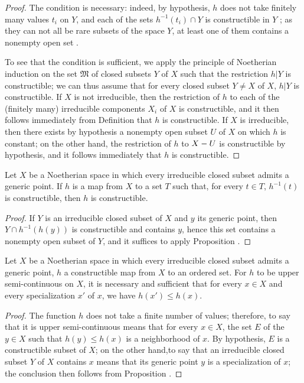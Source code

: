 \begin{proof}
The condition is necessary: indeed, by hypothesis, $h$ does not take finitely many values $t_i$ on $Y$, and each of the sets $h^{-1}(t_i)\cap Y$ is constructible in $Y$ ; as they can not all be rare subsets of the space $Y$, at least one of them contains a nonempty open set .

To see that the condition is sufficient, we apply the principle of Noetherian induction on the set $\mathfrak{M}$ of closed subsets $Y$ of $X$ such that the restriction $h|Y$ is constructible; we can thus assume that for every closed subset $Y\neq X$ of $X$,
$h|Y$ is constructible.
If $X$ is not irreducible, then the restriction of $h$ to each of the (finitely many) irreducible components $X_i$ of $X$ is constructible, and it then follows immediately from Definition  that $h$ is constructible.
If $X$ is irreducible, then there exists by hypothesis a nonempty open subset $U$ of $X$ on which $h$ is constant; on the other hand, the restriction of $h$ to $X- U$ is constructible by hypothesis, and it follows immediately that $h$ is constructible.
\end{proof}

\begin{corollary}[9.3.3]
\label{0.9.3.3}
Let $X$ be a Noetherian space in which every irreducible closed subset admits a generic point.
If $h$ is a map from $X$ to a set $T$ such that, for every $t\in T$, $h^{-1}(t)$ is constructible, then $h$ is constructible.
\end{corollary}

\begin{proof}
If $Y$ is an irreducible closed subset of $X$ and $y$ its generic point, then $Y\cap h^{-1}(h(y))$ is constructible and contains $y$, hence  this set contains a nonempty open subset of $Y$, and it suffices to apply Proposition .
\end{proof}

\begin{proposition}[9.3.4]
\label{0.9.3.4}
Let $X$ be a Noetherian space in which every irreducible closed subset admits a generic point, $h$ a constructible map from $X$ to an ordered set.
For $h$ to be upper semi-continuous on $X$, it is necessary and sufficient that for every $x\in X$ and every specialization  $x'$ of $x$, we have $h(x')\leq h(x)$.
\end{proposition}

\begin{proof}
The function $h$ does not take a finite number of values; therefore, to say that it is upper semi-continuous means that for every $x\in X$, the set $E$ of the $y\in X$ such that $h(y)\leq h(x)$ is a neighborhood of $x$.
By hypothesis, $E$ is a constructible subset of $X$; on the other hand,to say that an irreducible closed subset $Y$ of $X$ contains $x$ means that its generic point $y$ is a specialization of $x$; the conclusion then follows from Proposition .
\end{proof}


